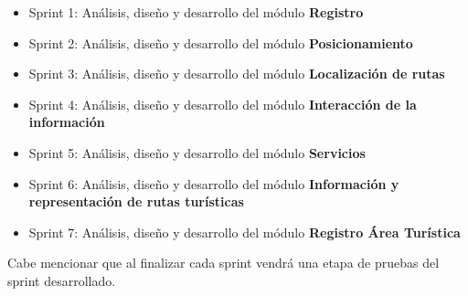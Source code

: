 \begin{itemize}
	\item Sprint 1: Análisis, diseño y desarrollo del módulo \textbf{Registro}
	
	\item Sprint 2: Análisis, diseño y desarrollo del módulo \textbf{Posicionamiento}
	
	\item Sprint 3: Análisis, diseño y desarrollo del módulo \textbf{Localización de rutas}
	
	\item Sprint 4: Análisis, diseño y desarrollo del módulo \textbf{Interacción de la información}
	
	\item Sprint 5: Análisis, diseño y desarrollo del módulo \textbf{Servicios}
	
	\item Sprint 6: Análisis, diseño y desarrollo del módulo \textbf{Información y representación de rutas turísticas}
	
	\item Sprint 7: Análisis, diseño y desarrollo del módulo \textbf{Registro Área Turística}
	
\end{itemize}

Cabe mencionar que al finalizar cada sprint vendrá una etapa de pruebas del sprint desarrollado. 
